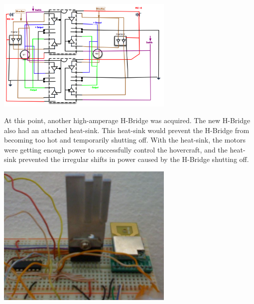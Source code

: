 \begin{minipage}{6.5in}
\begin{minipage}{6.5in}
\begin{minipage}{6.5in}
\begin{center}
  \includegraphics[width=85mm]{imageSources/designProblemsHBridge2.png}
\end{center}
\label{HbridgeWiring2}
\end{minipage}

At this point, another high-amperage H-Bridge was acquired. The new H-Bridge also had an attached heat-sink. This heat-sink would prevent the H-Bridge from becoming too hot and temporarily shutting off. With the heat-sink, the motors were getting enough power to successfully control the hovercraft, and the heat-sink prevented the irregular shifts in power caused by the H-Bridge shutting off.

\begin{minipage}{6.5in}
\begin{center}
  \includegraphics[width=85mm]{imageSources/designProblemsHBridgeHeatsink.png}
\end{center}
\label{HBridgeHeatsink}
\end{minipage}


\end{minipage}
\end{minipage}

